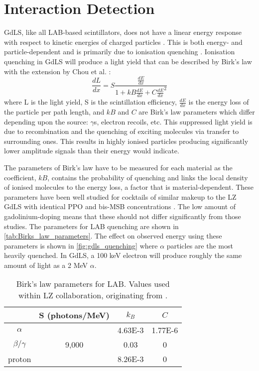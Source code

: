 \section{Interaction Detection}
\label{sec:od_physics}
\par
GdLS, like all LAB-based scintillators, does not have a linear energy response with respect to kinetic energies of charged particles \cite{nonlinear_gdls_ref}.
This is both energy- and particle-dependent and is primarily due to ionisation quenching \cite{lab_quenching_theory_ref}.
Ionisation quenching in GdLS will produce a light yield that can be described by Birk's law \cite{birks_law_ref} with the extension by Chou et al. \cite{generalised_birks_ref}:
\begin{equation} 
    \frac{dL}{dx} = S \frac{\frac{dE}{dx}}{1 + kB\frac{dE}{dx} + C\frac{dE}{dx}^2}
    \label{eq:birkslaw}
\end{equation}
where L is the light yield, S is the scintillation efficiency, $\frac{dE}{dx}$ is the energy loss of the particle per path length, and $kB$ and $C$ are Birk's law parameters which differ depending upon the source: $\gamma$s, electron recoils, etc.
This suppressed light yield is due to recombination and the quenching of exciting molecules via transfer to surrounding ones.
This results in highly ionised particles producing significantly lower amplitude signals than their energy would indicate.

\par
The parameters of Birk's law have to be measured for each material as the coefficient, $kB$, contains the probability of quenching and links the local density of ionised molecules to the energy loss, a factor that is material-dependent. 
These parameters have been well studied for cocktails of similar makeup to the LZ GdLS with identical PPO and bis-MSB concentrations \cite{ls_alpha_quenching_ref,ls_proton_quenching_ref}.
The low amount of gadolinium-doping means that these should not differ significantly from those studies.
The parameters for LAB quenching are shown in \autoref{tab:Birks_law_parameters}.
The effect on observed energy using these parameters is shown in \autoref{fig:gdls_quenching} where $\alpha$ particles are the most heavily quenched.
In GdLS, a 100 keV electron will produce roughly the same amount of light as a 2 MeV $\alpha$.

\begin{table}[]
    \centering
    \begin{tabular}{c | c | c | c }
                   & S (photons/MeV) & $k_{B}$ & $C$ \\ \hline
    $\alpha$       &                 & 4.63E-3 & 1.77E-6 \\
    $\beta/\gamma$ & 9,000           & 0.03    & 0 \\ 
    proton         &                 & 8.26E-3 & 0
    \end{tabular}
    \caption{Birk's law parameters for LAB. Values used within LZ collaboration, originating from \cite{ls_proton_quenching_ref}.}
    \label{tab:Birks_law_parameters}
\end{table} 

